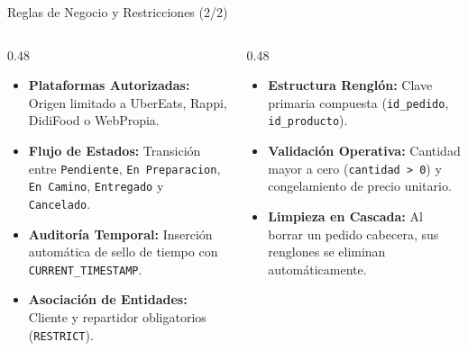 \documentclass[10pt,aspectratio=169]{beamer}
\begin{document}
\begin{frame}{Reglas de Negocio y Restricciones (2/2)}
    \begin{columns}[T]
        \begin{column}{0.48\textwidth}
            \begin{itemize}
                \item \textbf{Plataformas Autorizadas:} Origen limitado a UberEats, Rappi, DidiFood o WebPropia.
                \item \textbf{Flujo de Estados:} Transición entre \texttt{Pendiente}, \texttt{En Preparacion}, \texttt{En Camino}, \texttt{Entregado} y \texttt{Cancelado}.
                \item \textbf{Auditoría Temporal:} Inserción automática de sello de tiempo con \texttt{CURRENT\_TIMESTAMP}.
                \item \textbf{Asociación de Entidades:} Cliente y repartidor obligatorios (\texttt{RESTRICT}).
            \end{itemize}
        \end{column}

        \begin{column}{0.48\textwidth}
            \begin{itemize}
                \item \textbf{Estructura Renglón:} Clave primaria compuesta (\texttt{id\_pedido}, \texttt{id\_producto}).
                \item \textbf{Validación Operativa:} Cantidad mayor a cero (\texttt{cantidad > 0}) y congelamiento de precio unitario.
                \item \textbf{Limpieza en Cascada:} Al borrar un pedido cabecera, sus renglones se eliminan automáticamente.
            \end{itemize}
        \end{column}
    \end{columns}
\end{frame}
\end{document}
